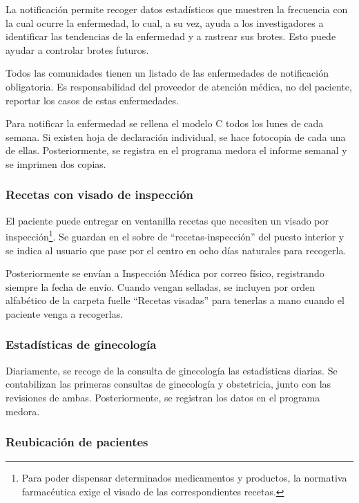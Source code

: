 La notificación permite recoger datos estadísticos que muestren la frecuencia con la cual ocurre la enfermedad, lo cual, a su vez, ayuda a los investigadores a identificar las tendencias de la enfermedad y a rastrear sus brotes. Esto puede ayudar a controlar brotes futuros.

Todos las comunidades tienen un listado de las enfermedades de notificación obligatoria. Es responsabilidad del proveedor de atención médica, no del paciente, reportar los casos de estas enfermedades.

Para notificar la enfermedad se rellena el modelo C todos los lunes de cada semana.
Si existen hoja de declaración individual, se hace fotocopia de cada una de ellas.
Posteriormente, se registra en el programa \Gls{medora} el informe semanal y se imprimen dos copias.


\subsubsection{Recetas con visado de inspección}

El paciente puede entregar en ventanilla recetas que necesiten un visado por inspección\footnote{Para poder dispensar determinados medicamentos y productos, la normativa farmacéutica exige el visado de las correspondientes recetas.}.
Se guardan en el sobre de ``recetas-inspección'' del puesto interior y se indica al usuario que pase por el centro en ocho días naturales para recogerla.

Posteriormente se envían a Inspección Médica por correo físico, registrando siempre la fecha de envío.
Cuando vengan selladas, se incluyen por orden alfabético de la carpeta fuelle ``Recetas visadas'' para tenerlas a mano cuando el paciente venga a recogerlas.

\subsubsection{Estadísticas de ginecología}

Diariamente, se recoge de la consulta de ginecología las estadísticas diarias.
Se contabilizan las primeras consultas de ginecología y obstetricia, junto con las revisiones de ambas.
Posteriormente, se registran los datos en el programa \Gls{medora}.

\subsubsection{Reubicación de pacientes}

